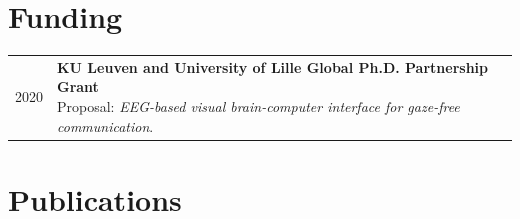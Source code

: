 \documentclass[10pt,a4paper]{article}
\begin{document}
    \section*{Funding}

    \begin{tabularx}{\linewidth}{@{}p{1.2in} X@{}}
        2020 & \makecell[{{X}}t]{\textbf{KU Leuven and University of Lille Global Ph.D. Partnership Grant} \\
        Proposal: \textit{EEG-based visual brain-computer interface for gaze-free communication}.} \\

    \end{tabularx}

    \section*{Publications}


    \nocite{*}

    \printbibliography[heading=none]
\end{document}
